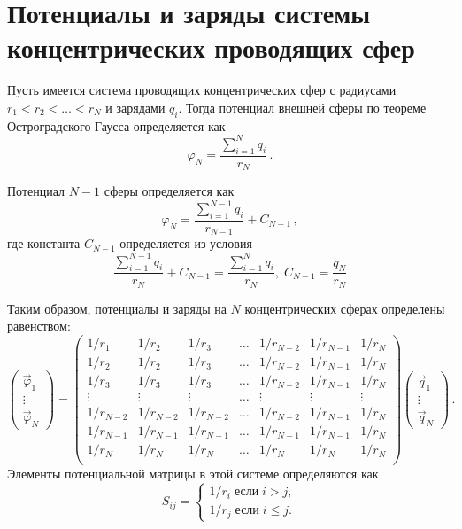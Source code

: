 \documentclass[12pt,a4paper]{scrartcl}
\begin{document}
\section{Потенциалы и заряды системы концентрических проводящих сфер}

Пусть имеется система проводящих концентрических сфер с радиусами 
$r_1<r_2<\dots<r_N$ и зарядами $q_i$. Тогда потенциал внешней сферы по теореме 
Остроградского-Гаусса определяется как
\begin{equation}
  \varphi_N=\frac{\sum\limits_{i=1}^Nq_i}{r_N}\,.
\end{equation}

Потенциал $N-1$ сферы определяется как
\begin{equation}
  \varphi_N=\frac{\sum\limits_{i=1}^{N-1}q_i}{r_{N-1}}+C_{N-1}\,,
\end{equation}
где константа $C_{N-1}$ определяется из условия
\begin{equation}
 \frac{\sum\limits_{i=1}^{N-1}q_i}{r_{N}}+C_{N-1}=
 \frac{\sum\limits_{i=1}^Nq_i}{r_N},\;
  C_{N-1}=\frac{q_N}{r_N}
\end{equation}

Таким образом, потенциалы и заряды на $N$ концентрических сферах определены 
равенством:
\begin{equation}
  \left(
  \begin{array}{c}
    \vec \varphi_1\\
    \vdots\\
    \vec \varphi_N
  \end{array}
  \right)=
  \left(
  \begin{array}{ccccccc}
1/r_1 & 1/r_2 & 1/r_3 & \ldots & 1/r_{N-2} & 1/r_{N-1} & 1/r_N\\
1/r_2 & 1/r_2 & 1/r_3 & \ldots & 1/r_{N-2} & 1/r_{N-1} & 1/r_N\\
1/r_3 & 1/r_3 & 1/r_3 & \ldots & 1/r_{N-2} & 1/r_{N-1} & 1/r_N\\
\vdots & \vdots & \vdots & \ldots & \vdots & \vdots & \vdots\\
1/r_{N-2} & 1/r_{N-2} & 1/r_{N-2} & \ldots & 1/r_{N-2} & 1/r_{N-1} & 1/r_N\\
1/r_{N-1} & 1/r_{N-1} & 1/r_{N-1} & \ldots & 1/r_{N-1} & 1/r_{N-1} & 1/r_N\\    
1/r_N & 1/r_N & 1/r_N & \ldots & 1/r_N & 1/r_N & 1/r_N\\
  \end{array}
  \right)
  \left(
  \begin{array}{c}
    \vec q_1\\
    \vdots\\
    \vec q_N
  \end{array}
  \right)\,.
\end{equation}
Элементы потенциальной матрицы в этой системе определяются как
\begin{equation}
  S_{ij}=
  \left\{
  \begin{array}{c}
    1/r_i\;\mbox{если}\;i>j,\\
    1/r_j\;\mbox{если}\;i\le j.
  \end{array}
  \right.
\end{equation}
\end{document}
